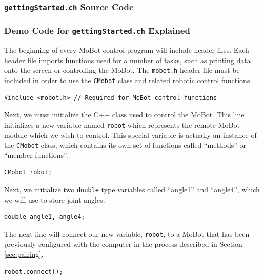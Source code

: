 \documentclass{article}
\begin{document}
\subsubsection{\texttt{gettingStarted.ch} Source Code}


\subsubsection{\label{sec:democode}Demo Code for \texttt{gettingStarted.ch} Explained}
The beginning of every MoBot control program will include header files. Each
header file imports functions used for a number of tasks, such as printing
data onto the screen or controlling the MoBot. The \texttt{mobot.h} header
file must be included in order to use the \texttt{CMobot} class and related
robotic control functions.

\begin{verbatim}
#include <mobot.h> // Required for MoBot control functions
\end{verbatim}

Next, we must initialize the C++ class used to control the MoBot. This line
initializes a new variable named \texttt{robot} which represents the remote
MoBot module which we wish to control. This special variable is actually an
instance of the \texttt{CMobot} class, which contains its own set of
functions called ``methods'' or ``member functions''.
\begin{verbatim}
CMobot robot;
\end{verbatim}

Next, we initialize two \texttt{double} type variables called 
``angle1'' and ``angle4'', which we will use to store joint angles.
\begin{verbatim}
double angle1, angle4;
\end{verbatim}

The next line will connect our new variable, \texttt{robot}, to a
MoBot that has been previously configured with the computer in the 
process described in Section \ref{sec:pairing}.
\begin{verbatim}
robot.connect();
\end{verbatim}
\end{document}
